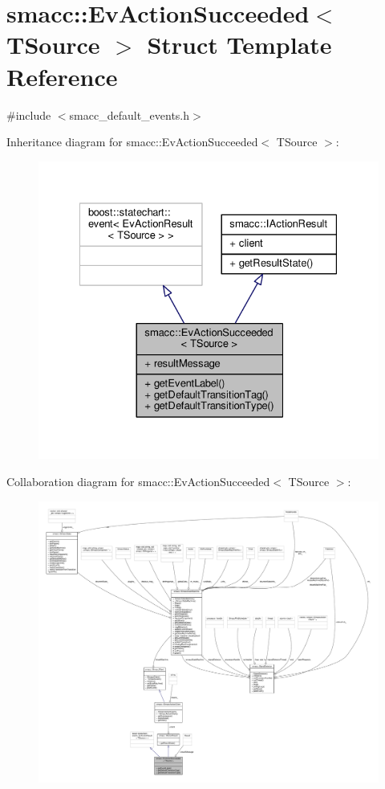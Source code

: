 \hypertarget{structsmacc_1_1EvActionSucceeded}{}\section{smacc\+:\+:Ev\+Action\+Succeeded$<$ T\+Source $>$ Struct Template Reference}
\label{structsmacc_1_1EvActionSucceeded}


{\ttfamily \#include $<$smacc\+\_\+default\+\_\+events.\+h$>$}



Inheritance diagram for smacc\+:\+:Ev\+Action\+Succeeded$<$ T\+Source $>$\+:
\nopagebreak
\begin{figure}[H]
\begin{center}
\leavevmode
\includegraphics[width=328pt]{structsmacc_1_1EvActionSucceeded__inherit__graph}
\end{center}
\end{figure}


Collaboration diagram for smacc\+:\+:Ev\+Action\+Succeeded$<$ T\+Source $>$\+:
\nopagebreak
\begin{figure}[H]
\begin{center}
\leavevmode
\includegraphics[width=350pt]{structsmacc_1_1EvActionSucceeded__coll__graph}
\end{center}
\end{figure}
